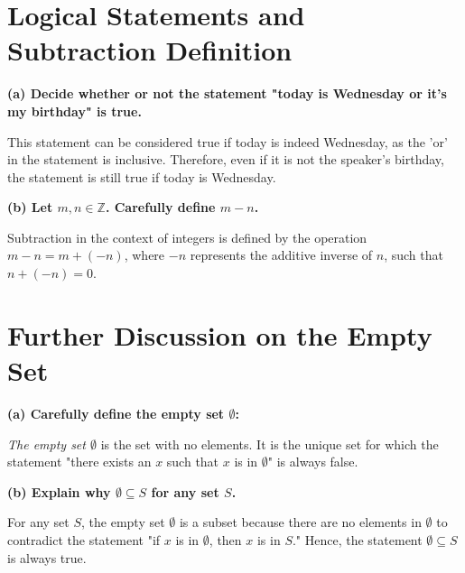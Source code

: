 \section*{Logical Statements and Subtraction Definition}

\textbf{(a) Decide whether or not the statement "today is Wednesday or it's my birthday" is true.}

This statement can be considered true if today is indeed Wednesday, as the 'or' in the statement is inclusive. Therefore, even if it is not the speaker's birthday, the statement is still true if today is Wednesday.

\textbf{(b) Let \( m, n \in \mathbb{Z} \). Carefully define \( m - n \).}

Subtraction in the context of integers is defined by the operation \( m - n = m + (-n) \), where \( -n \) represents the additive inverse of \( n \), such that \( n + (-n) = 0 \).

\section*{Further Discussion on the Empty Set}

\textbf{(a) Carefully define the empty set \( \emptyset \):}

\textit{The empty set \( \emptyset \)} is the set with no elements. It is the unique set for which the statement "there exists an \( x \) such that \( x \) is in \( \emptyset \)" is always false.

\textbf{(b) Explain why \( \emptyset \subseteq S \) for any set \( S \).}

For any set \( S \), the empty set \( \emptyset \) is a subset because there are no elements in \( \emptyset \) to contradict the statement "if \( x \) is in \( \emptyset \), then \( x \) is in \( S \)." Hence, the statement \( \emptyset \subseteq S \) is always true.
